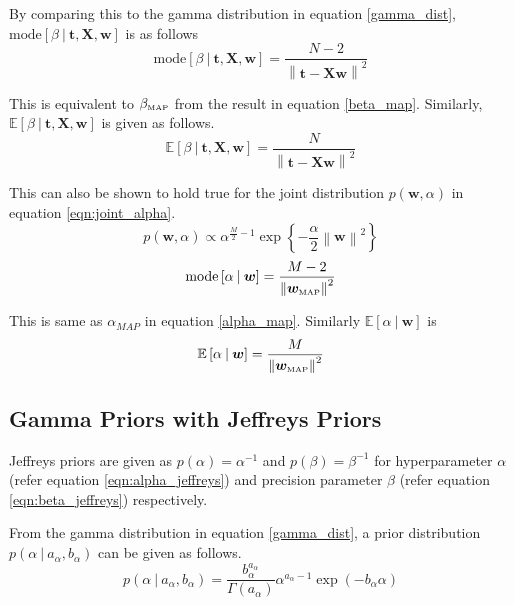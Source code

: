 \documentclass[11pt]{article}
\newcommand{\mean}[1]{\mathbb{E}\left[#1\right]}
\newcommand{\map}[1]{{#1}_{\text{\tiny MAP}}}
\newcommand\given[1][]{\:#1\vert\:}
\newcommand{\norm}[1]{\left\lVert#1\right\rVert}
\begin{document}
By comparing this to the gamma distribution in equation \ref{gamma_dist}, $\text{mode}\left[\beta \given \bm{t}, \bm{X}, \bm{w}\right]$ is as follows
\begin{equation}
    \text{mode}\left[\beta \given \bm{t}, \bm{X}, \bm{w}\right] = \frac{N-2}{\norm{\bm{t} - \bm{X}\bm{w}}^2}
\end{equation}

This is equivalent to $\map{\beta}$ from the result in equation \ref{beta_map}. Similarly, $\mean{\beta \given \bm{t}, \bm{X}, \bm{w}}$ is given as follows.
\begin{equation}
    \mean{\beta \given \bm{t}, \bm{X}, \bm{w}} = \frac{N}{\norm{\bm{t} - \bm{X}\bm{w}}^2}
\end{equation}

This can also be shown to hold true for the joint distribution $p(\bm{w}, \alpha)$ in equation \ref{eqn:joint_alpha}.
\begin{equation}
    p(\bm{w},\alpha) \propto \alpha^{\frac{M}{2}-1}\exp{\left\{ -\frac{\alpha}{2}\norm{\bm{w}}^2\right\}}
\end{equation}
\begin{equation}
    \text{mode}\left[\alpha \given \bm{w}\right] = \frac{M-2}{\norm{\map{\bm{w}}}^2}
\end{equation}

This is same as $\alpha_{MAP}$ in equation \ref{alpha_map}. Similarly $\mean{\alpha \given \bm{w}}$ is
\begin{equation}
    \mean{\alpha \given \bm{w}} = \frac{M}{\norm{\map{\bm{w}}}^2}
\end{equation}

\subsection{Gamma Priors with Jeffreys Priors}

Jeffreys priors are given as $p(\alpha) = \alpha^{-1}$ and $p(\beta) = \beta^{-1}$ for hyperparameter $\alpha$ (refer equation \ref{eqn:alpha_jeffreys}) and precision parameter $\beta$ (refer equation \ref{eqn:beta_jeffreys}) respectively. 

From the gamma distribution in equation \ref{gamma_dist}, a prior distribution $p(\alpha \given a_{\alpha}, b_{\alpha})$ can be given as follows.
\begin{equation} \label{gamma_alpha}
    p(\alpha \given a_{\alpha}, b_{\alpha}) =  \frac{b_{\alpha}^{a_{\alpha}}}{\Gamma(a_{\alpha})}\alpha^{a_{\alpha}-1}\exp{(-b_{\alpha}\alpha)}
\end{equation}
\end{document}
